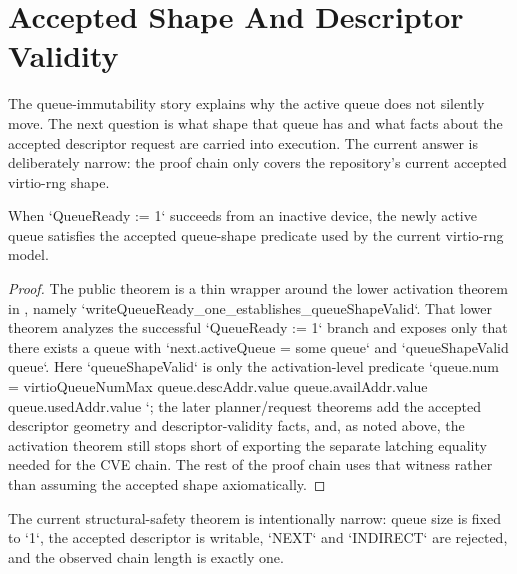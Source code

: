 \section{Accepted Shape And Descriptor Validity}

The queue-immutability story explains why the active queue does not silently move.
The next question is what shape that queue has and what facts about the accepted descriptor request are carried into execution.
The current answer is deliberately narrow: the proof chain only covers the repository's current accepted virtio-rng shape.

\begin{theorem}
\label{thm:queue-activation}
\leanok
When `QueueReady := 1` succeeds from an inactive device, the newly active queue satisfies the accepted queue-shape predicate used by the current virtio-rng model.
\end{theorem}

\begin{proof}
\leanok
{}
The public theorem is a thin wrapper around the lower activation theorem in , namely `writeQueueReady_one_establishes_queueShapeValid`.
That lower theorem analyzes the successful `QueueReady := 1` branch and exposes only that there exists a queue with `next.activeQueue = some queue` and `queueShapeValid queue`.
Here `queueShapeValid` is only the activation-level predicate `queue.num = virtioQueueNumMax \land queue.descAddr.value  \land queue.availAddr.value  \land queue.usedAddr.value `; the later planner/request theorems add the accepted descriptor geometry and descriptor-validity facts, and, as noted above, the activation theorem still stops short of exporting the separate latching equality needed for the CVE chain.
The rest of the proof chain uses that witness rather than assuming the accepted shape axiomatically.
\end{proof}

\begin{theorem}
\label{thm:queue-structure}
\leanok
The current structural-safety theorem is intentionally narrow: queue size is fixed to `1`, the accepted descriptor is writable, `NEXT` and `INDIRECT` are rejected, and the observed chain length is exactly one.
\end{theorem}


